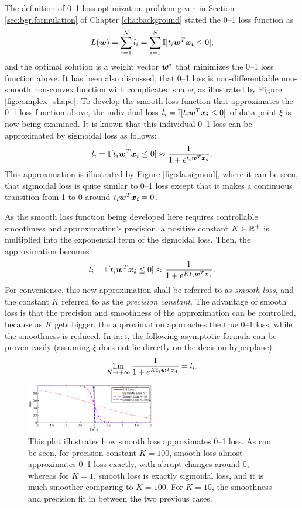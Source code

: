 The definition of 0--1 loss optimization problem given in Section \ref{sec:bgr.formulation} of Chapter \ref{cha:background} stated the 0--1 loss function as 
$$L(\boldsymbol{w}) = \sum_{i=1}^N l_i = \sum_{i=1}^N \mathbb{I} [t_i \boldsymbol{w}^T \boldsymbol{x_i} \leq 0],$$
and the optimal solution is a weight vector $\boldsymbol{w}^*$ that minimizes the 0--1 loss function above. It has been also discussed, that  0--1 loss is non-differentiable non-smooth non-convex function with complicated shape, as illustrated by Figure \ref{fig:complex_shape}. To develop the smooth loss function that approximates the 0--1 loss function above, the individual loss $l_i = \mathbb{I} [t_i \boldsymbol{w}^T \boldsymbol{x_i} \leq 0]$ of data point $\xi$ is now being examined. It is known that this individual 0--1 loss can be approximated by sigmoidal loss as follows:
$$l_i = \mathbb{I} [t_i \boldsymbol{w}^T \boldsymbol{x_i} \leq 0] \approx \frac{1}{1 + e^{t_i \boldsymbol{w}^T \boldsymbol{x_i} }}.$$
This approximation is illustrated by Figure \ref{fig:sla.sigmoid}, where it can be seen, that sigmoidal loss is quite similar to 0--1 loss except that it makes a continuous transition from 1 to 0 around $t_i \boldsymbol{w}^T \boldsymbol{x_i} = 0$. 

As the smooth loss function being developed here requires controllable smoothness and approximation's precision, a positive constant $K \in \mathbb{R}^+$ is multiplied into the exponential term of the sigmoidal loss. Then, the approximation becomes
$$l_i = \mathbb{I} [t_i \boldsymbol{w}^T \boldsymbol{x_i} \leq 0] \approx \frac{1}{1 + e^{Kt_i \boldsymbol{w}^T \boldsymbol{x_i} }}.$$
For convenience, this new approximation shall be referred to as \emph{smooth loss}, and the constant $K$ referred to as the \emph{precision constant}. The advantage of smooth loss is that the precision and smoothness of the approximation can be controlled, because as $K$ gets bigger, the approximation approaches the true 0--1 loss, while the smoothness is reduced. In fact, the following asymptotic formula can be proven easily (assuming $\xi$ does not lie directly on the decision hyperplane):
$$\lim_{K \rightarrow +\infty} \frac{1}{1 + e^{Kt_i \boldsymbol{w}^T \boldsymbol{x_i} }} = l_i.$$

\begin{figure}[here]
\includegraphics[width=0.50\textwidth]{images/fig52_smooth.eps}
\caption{
This plot illustrates how smooth loss approximates 0--1 loss. As can be seen, for precision constant $K=100$, smooth loss almost approximates 0--1 loss exactly, with abrupt changes around 0, whereas for $K=1$, smooth loss is exactly sigmoidal loss, and it is much smoother comparing to $K=100$. For $K=10$, the smoothness and precision fit in between the two previous cases. 
}
\label{fig:sla.smooth}
\end{figure}

